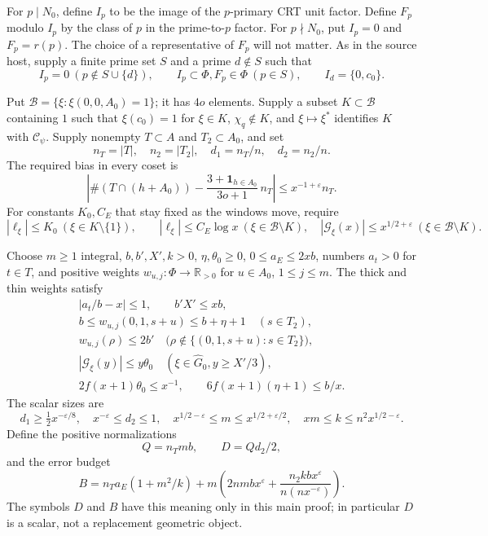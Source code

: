 \documentclass[11pt,a4paper]{article}
\numberwithin{equation}{section}
\theoremstyle{remark}\newtheorem{remark}[theorem]{Remark}
\begin{document}
For $p\mid N_0$, define $I_p$ to be the image of the $p$-primary
CRT unit factor.  Define $F_p$ modulo $I_p$ by the class of $p$
in the prime-to-$p$ factor.  For $p\nmid N_0$, put $I_p=0$ and
$F_p=r(p)$.  The choice of a representative of $F_p$ will not
matter.  As in the source host, supply a finite prime set $S$ and
a prime $d\notin S$ such that
\[
 I_p=0\ (p\notin S\cup\{d\}),\qquad
 I_p\subset\Phi, F_p\in\Phi\ (p\in S),\qquad
 I_d=\{0,\allowbreak{} c_0\}.                                    \tag{CMP.2}
\]

Put $\mathcal B=\{\xi:\xi(0,0,\allowbreak{} A_0)=1\}$; it has $4o$
elements.  Supply a subset $K\subset\mathcal B$ containing $1$
such that $\xi(c_0)=1$ for $\xi\in K$, $\chi_q\notin K$, and
$\xi\mapsto\xi^*$ identifies $K$ with
$\mathcal C_\psi$.  Supply nonempty $T\subset A$ and
$T_2\subset A_0$, and set
\[
 n_T=|T|,\quad n_2=|T_2|,\quad d_1=n_T/n,\quad d_2=n_2/n.
\]
The required bias in every coset is
\[
 \left|\#(T\cap(h+A_0))-
       \frac{3+\mathbf1_{h\in A_0}}{3o+1}\,\allowbreak{} n_T\right|
                   \le x^{-1+\varepsilon}n_T.
 \tag{CMP.3}
\]
For constants $K_0,\allowbreak{} C_E$ that stay fixed as the windows move,
require
\[
 |\ell_\xi|\le K_0\ (\xi\in K\setminus\{1\}),\qquad
 |\ell_\xi|\le C_E\log x\ (\xi\in\mathcal B\setminus K),
 \quad
 |\mathcal G_\xi(x)|\le x^{1/2+\varepsilon}
                 \ (\xi\in\mathcal B\setminus K).
 \tag{CMP.4}
\]

Choose $m\ge1$ integral, $b,\allowbreak{} b',\allowbreak{} X',\allowbreak{} k>0$, $\eta,\theta_0\ge0$,
$0\le a_E\le2xb$, numbers $a_t>0$ for $t\in T$, and positive
weights $w_{u,\allowbreak{} j}:\Phi\to\mathbb R_{>0}$ for
$u\in A_0$, $1\le j\le m$.  The thick and thin weights satisfy
\begin{gather*}
 |a_t/b-x|\le1,\qquad b'X'\le xb,\\
 b\le w_{u,\allowbreak{} j}(0,1,\allowbreak{} s+u)\le b+\eta+1\quad(s\in T_2),\\
 w_{u,\allowbreak{} j}(\rho)\le2b'
   \quad\bigl(\rho\notin\{(0,1,\allowbreak{} s+u):s\in T_2\}\bigr),\\
 |\mathcal G_\xi(y)|\le y\theta_0
           \quad(\xi\in\widehat G_0, y\ge X'/3),\\
 2f(x+1)\theta_0\le x^{-1},\qquad
 6f(x+1)(\eta+1)\le b/x.                         \tag{CMP.5}
\end{gather*}
The scalar sizes are
\[
 d_1\ge\tfrac12x^{-\varepsilon/8},\quad
 x^{-\varepsilon}\le d_2\le1,\quad
 x^{1/2-\varepsilon}\le m\le x^{1/2+\varepsilon/2},\quad
 xm\le k\le n^2x^{1/2-\varepsilon}.                \tag{CMP.6}
\]
Define the positive normalizations
\[
 Q=n_Tmb,\qquad D=Qd_2/2,
\]
and the error budget
\[
 B=n_Ta_E(1+m^2/k)
       +m\left(2nmbx^\varepsilon+
            \frac{n_2kbx^\varepsilon}{n(nx^{-\varepsilon})}\right).
 \tag{CMP.7}
\]
The symbols $D$ and $B$ have this meaning only in this main proof;
in particular $D$ is a scalar, not a replacement geometric object.
\end{document}
